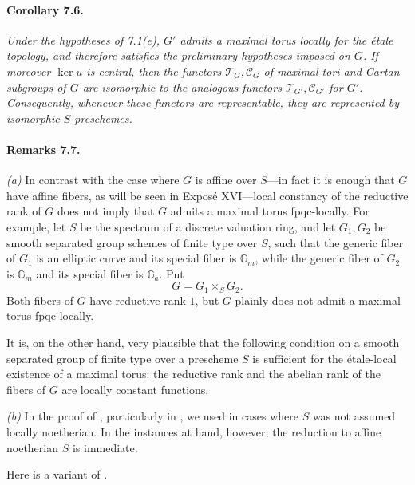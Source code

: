 \paragraph{\textbf{Corollary 7.6.}}
\emph{Under the hypotheses of 7.1\textup{(e)}, \(G'\) admits a
maximal torus locally for the étale topology, and therefore satisfies
the preliminary hypotheses imposed on \(G\). If moreover \(\ker u\)
is central, then the functors \(\mathcal T_G,\mathcal C_G\) of
maximal tori and Cartan subgroups of \(G\) are isomorphic to the
analogous functors \(\mathcal T_{G'},\mathcal C_{G'}\) for \(G'\).
Consequently, whenever these functors are representable, they are
represented by isomorphic \(S\)-preschemes.}

\paragraph{\textbf{Remarks 7.7.}}
\emph{(a)} In contrast with the case where \(G\) is affine over
\(S\)---in fact it is enough that \(G\) have affine fibers, as will
be seen in Exposé XVI---local constancy of the reductive rank of
\(G\) does not imply that \(G\) admits a maximal torus fpqc-locally.
For example, let \(S\) be the spectrum of a discrete valuation ring,
and let \(G_1,G_2\) be smooth separated group schemes of finite type
over \(S\), such that the generic fiber of \(G_1\) is an elliptic
curve and its special fiber is \(\mathbb G_m\), while the generic
fiber of \(G_2\) is \(\mathbb G_m\) and its special fiber is
\(\mathbb G_a\). Put
\[
  G=G_1\times_S G_2.
\]
Both fibers of \(G\) have reductive rank \(1\), but \(G\) plainly
does not admit a maximal torus fpqc-locally.

It is, on the other hand, very plausible that the following
condition on a smooth separated group of finite type over a
prescheme \(S\) is sufficient for the étale-local existence of a
maximal torus: the reductive rank and the abelian rank of the fibers
of \(G\) are locally constant functions.

\emph{(b)} In the proof of , particularly in \textup{}, we
used  in cases where \(S\) was not assumed locally noetherian.
In the instances at hand, however, the reduction to affine
noetherian \(S\) is immediate.

Here is a variant of .

